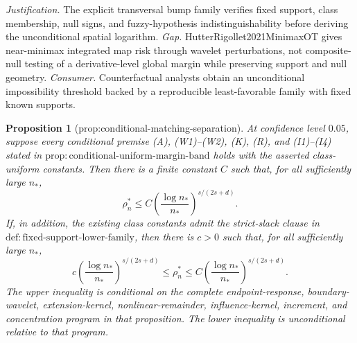 \documentclass{article}
\newtheorem{proposition}{Proposition}
\begin{document}
\par\smallskip\noindent \textit{Justification.} The explicit transversal bump family verifies fixed support, class membership, null signs, and fuzzy-hypothesis indistinguishability before deriving the unconditional spatial logarithm. \textit{Gap.} HutterRigollet2021MinimaxOT gives near-minimax integrated map risk through wavelet perturbations, not composite-null testing of a derivative-level global margin while preserving support and null geometry. \textit{Consumer.} Counterfactual analysts obtain an unconditional impossibility threshold backed by a reproducible least-favorable family with fixed known supports.

\begin{proposition}[prop:conditional-matching-separation]\label{prop:conditional-matching-separation}
At confidence level \(0.05\), suppose every conditional premise (A), (W1)--(W2), (K), (R), and (I1)--(I4) stated in \(\mathrm{prop:conditional\text{-}uniform\text{-}margin\text{-}band}\) holds with the asserted class-uniform constants. Then there is a finite constant \(C\) such that, for all sufficiently large \(n_\ast\), \[ \rho_n^\ast\le C\left(\frac{\log n_\ast}{n_\ast}\right)^{s/(2s+d)}. \] If, in addition, the existing class constants admit the strict-slack clause in \(\mathrm{def:fixed\text{-}support\text{-}lower\text{-}family}\), then there is \(c>0\) such that, for all sufficiently large \(n_\ast\), \[ c\left(\frac{\log n_\ast}{n_\ast}\right)^{s/(2s+d)} \le\rho_n^\ast\le C\left(\frac{\log n_\ast}{n_\ast}\right)^{s/(2s+d)}. \] The upper inequality is conditional on the complete endpoint-response, boundary-wavelet, extension-kernel, nonlinear-remainder, influence-kernel, increment, and concentration program in that proposition. The lower inequality is unconditional relative to that program.
\end{proposition}
\end{document}
